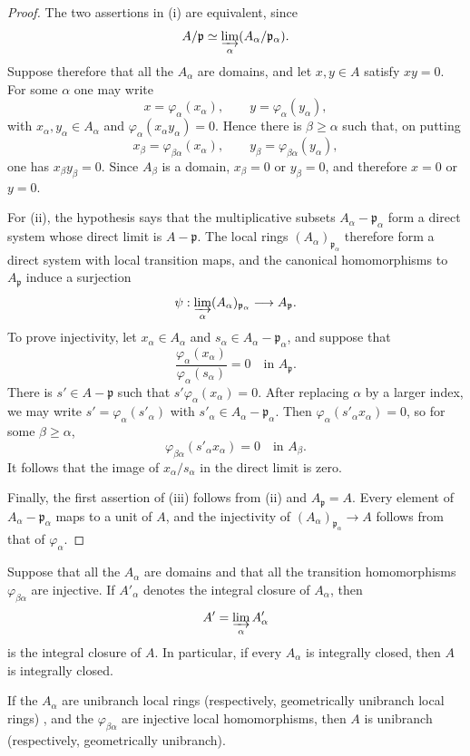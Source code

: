 \begin{proof}
The two assertions in {\rm(i)} are equivalent, since
\[
  A/\mathfrak p
  \simeq
  \varinjlim_\alpha(A_\alpha/\mathfrak p_\alpha).
\]
Suppose therefore that all the $A_\alpha$ are domains, and let
$x,y\in A$ satisfy $xy=0$.  For some $\alpha$ one may write
\[
  x=\varphi_\alpha(x_\alpha),
  \qquad
  y=\varphi_\alpha(y_\alpha),
\]
with $x_\alpha,y_\alpha\in A_\alpha$ and
$\varphi_\alpha(x_\alpha y_\alpha)=0$.  Hence there is
$\beta\geq\alpha$ such that, on putting
\[
  x_\beta=\varphi_{\beta\alpha}(x_\alpha),
  \qquad
  y_\beta=\varphi_{\beta\alpha}(y_\alpha),
\]
one has $x_\beta y_\beta=0$.  Since $A_\beta$ is a domain,
$x_\beta=0$ or $y_\beta=0$, and therefore $x=0$ or $y=0$.

For {\rm(ii)}, the hypothesis says that the multiplicative
subsets $A_\alpha-\mathfrak p_\alpha$ form a direct system whose
direct limit is $A-\mathfrak p$.  The local rings
$(A_\alpha)_{\mathfrak p_\alpha}$ therefore form a direct system
with local transition maps, and the canonical homomorphisms to
$A_{\mathfrak p}$ induce a surjection
\[
  \psi:
  \varinjlim_\alpha(A_\alpha)_{\mathfrak p_\alpha}
  \longrightarrow A_{\mathfrak p}.
\]
To prove injectivity, let $x_\alpha\in A_\alpha$ and
$s_\alpha\in A_\alpha-\mathfrak p_\alpha$, and suppose that
\[
  \frac{\varphi_\alpha(x_\alpha)}
       {\varphi_\alpha(s_\alpha)}
  =0
  \quad\text{in }A_{\mathfrak p}.
\]
There is $s'\in A-\mathfrak p$ such that
$s'\varphi_\alpha(x_\alpha)=0$.  After replacing $\alpha$ by a
larger index, we may write
$s'=\varphi_\alpha(s'_\alpha)$ with
$s'_\alpha\in A_\alpha-\mathfrak p_\alpha$.  Then
$\varphi_\alpha(s'_\alpha x_\alpha)=0$, so for some
$\beta\geq\alpha$,
\[
  \varphi_{\beta\alpha}(s'_\alpha x_\alpha)=0
  \quad\text{in }A_\beta.
\]
It follows that the image of $x_\alpha/s_\alpha$ in the direct
limit is zero.

Finally, the first assertion of {\rm(iii)} follows from {\rm(ii)}
and $A_{\mathfrak p}=A$.  Every element of
$A_\alpha-\mathfrak p_\alpha$ maps to a unit of $A$, and the
injectivity of
$(A_\alpha)_{\mathfrak p_\alpha}\to A$ follows from that of
$\varphi_\alpha$.
\end{proof}

\begin{corollary}[5.13.4]
\label{IV.5.13.4}
Suppose that all the $A_\alpha$ are domains and that all the
transition homomorphisms $\varphi_{\beta\alpha}$ are injective.
If $A'_\alpha$ denotes the integral closure of $A_\alpha$, then
\[
  A'=\varinjlim_\alpha A'_\alpha
\]
is the integral closure of $A$.  In particular, if every
$A_\alpha$ is integrally closed, then $A$ is integrally closed.

If the $A_\alpha$ are unibranch local rings
(respectively, geometrically unibranch local rings)
, and the $\varphi_{\beta\alpha}$ are injective
local homomorphisms, then $A$ is unibranch
(respectively, geometrically unibranch).
\end{corollary}

